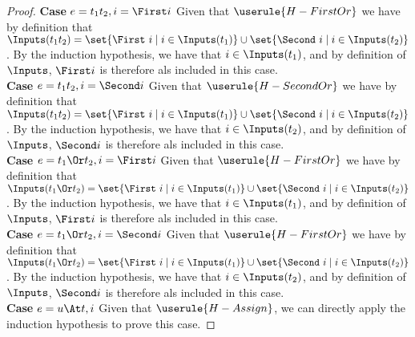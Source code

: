 \begin{proof}
  \noindent\textbf{Case} $e=t_1\And t_2 , i=\First i$ Given that $\userule{H-FirstOr}$ we have by definition that $\Inputs(t_1\And t_2) = \set{\First\ i \mid i \in \Inputs(t_1)} \cup \set{\Second\ i \mid i \in \Inputs(t_2)}$. By the induction hypothesis, we have that $i\in\Inputs(t_1)$, and by definition of $\Inputs$, $\First i$ is therefore als included in this case.\\
  \noindent\textbf{Case} $e=t_1\And t_2 , i=\Second i$ Given that $\userule{H-SecondOr}$ we have by definition that $\Inputs(t_1\And t_2) = \set{\First\ i \mid i \in \Inputs(t_1)} \cup \set{\Second\ i \mid i \in \Inputs(t_2)}$. By the induction hypothesis, we have that $i\in\Inputs(t_2)$, and by definition of $\Inputs$, $\Second i$ is therefore als included in this case.\\
  \noindent\textbf{Case} $e=t_1\Or t_2 , i=\First i$ Given that $\userule{H-FirstOr}$ we have by definition that $\Inputs(t_1\Or t_2) = \set{\First\ i \mid i \in \Inputs(t_1)} \cup \set{\Second\ i \mid i \in \Inputs(t_2)}$. By the induction hypothesis, we have that $i\in\Inputs(t_1)$, and by definition of $\Inputs$, $\First i$ is therefore als included in this case.\\
  \noindent\textbf{Case} $e=t_1\Or t_2 , i=\Second i$ Given that $\userule{H-FirstOr}$ we have by definition that $\Inputs(t_1\Or t_2) = \set{\First\ i \mid i \in \Inputs(t_1)} \cup \set{\Second\ i \mid i \in \Inputs(t_2)}$. By the induction hypothesis, we have that $i\in\Inputs(t_2)$, and by definition of $\Inputs$, $\Second i$ is therefore als included in this case.\\
  \noindent\textbf{Case} $e=u\At t, i$ Given that $\userule{H-Assign}$, we can directly apply the induction hypothesis to prove this case.
\end{proof}
